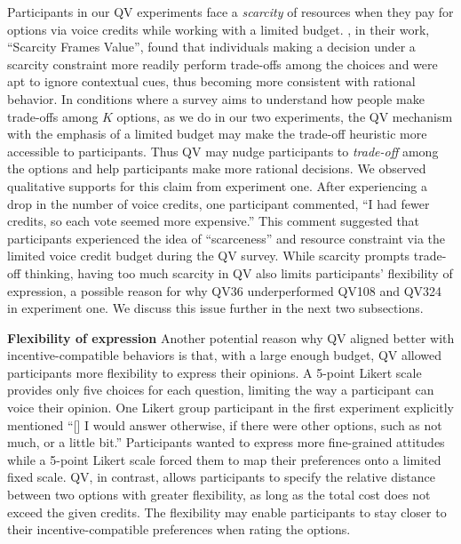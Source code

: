 Participants in our QV experiments face a \textit{scarcity} of resources when they pay for options via voice credits while working with a limited budget. \textcite{Shah2015a}, in their work, ``Scarcity Frames Value'', found that individuals making a decision under a scarcity constraint more readily perform trade-offs among the choices and were apt to ignore contextual cues, thus becoming more consistent with rational behavior. In conditions where a survey aims to understand how people make trade-offs among $K$ options, as we do in our two experiments, the QV mechanism with the emphasis of a limited budget may make the trade-off heuristic more accessible to participants. Thus QV may nudge participants to \textit{trade-off} among the options and help participants make more rational decisions. We observed qualitative supports for this claim from experiment one. After experiencing a drop in the number of voice credits, one participant commented, ``I had fewer credits, so each vote seemed more expensive.'' This comment suggested that participants experienced the idea of ``scarceness'' and resource constraint via the limited voice credit budget during the QV survey. While scarcity prompts trade-off thinking, having too much scarcity in QV also limits participants' flexibility of expression, a possible reason for why QV36 underperformed QV108 and QV324 in experiment one. We discuss this issue further in the next two subsections.




\textbf{Flexibility of expression}
Another potential reason why QV aligned better with incentive-compatible behaviors is that, with a large enough budget, QV allowed participants more flexibility to express their opinions. A 5-point Likert scale provides only five choices for each question, limiting the way a participant can voice their opinion. One Likert group participant in the first experiment explicitly mentioned ``[\textellipsis] I would answer otherwise, if there were other options, such as not much, or a little bit.'' Participants wanted to express more fine-grained attitudes while a 5-point Likert scale forced them to map their preferences onto a limited fixed scale. QV, in contrast, allows participants to specify the relative distance between two options with greater flexibility, as long as the total cost does not exceed the given credits. The flexibility may enable participants to stay closer to their incentive-compatible preferences when rating the options.

